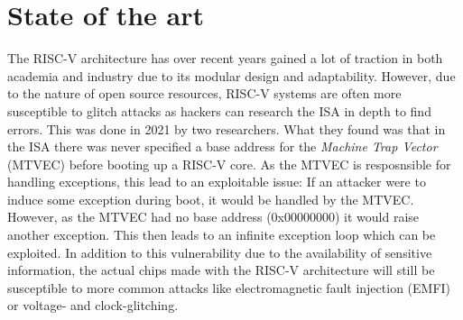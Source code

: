 \chapter{State of the art}
\label{chap2}


The RISC-V architecture has over recent years gained a lot of traction in both academia and industry due to its modular design and adaptability\cite{source2}. However, due to the nature of open source resources, RISC-V systems are often more susceptible to glitch attacks as hackers can research the ISA in depth to find errors. This was done in 2021 by two researchers\cite{isa_exploit}. What they found was that in the ISA there was never specified a base address for the \textit{Machine Trap Vector} (MTVEC) before booting up a RISC-V core. As the MTVEC is resposnsible for handling exceptions, this lead to an exploitable issue: If an attacker were to induce some exception during boot, it would be handled by the MTVEC. However, as the MTVEC had no base address (0x00000000) it would raise another exception. This then leads to an infinite exception loop which can be exploited. In addition to this vulnerability due to the availability of sensitive information, the actual chips made with the RISC-V architecture will still be susceptible to more common attacks like electromagnetic fault injection (EMFI) or voltage- and clock-glitching. 

